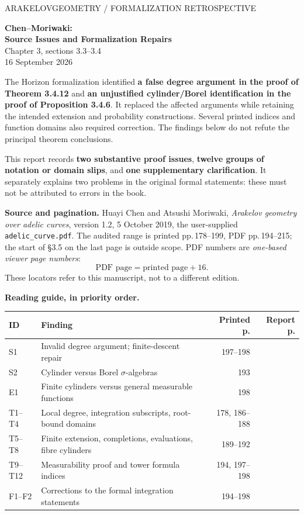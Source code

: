 \documentclass[10pt,a4paper]{article}
\newcommand{\code}[1]{{\small\nolinkurl{#1}}}
\begin{document}
\thispagestyle{plain}
{\small\sffamily\color{graytext}ARAKELOVGEOMETRY \quad / \quad FORMALIZATION RETROSPECTIVE}
\vspace{10pt}
\begin{flushleft}
{\huge\sffamily\bfseries\color{navy}Chen--Moriwaki:\\[3pt]Source Issues and Formalization Repairs}\\[10pt]
{\large Chapter 3, sections 3.3--3.4}\\[5pt]
{16 September 2026}
\end{flushleft}

The Horizon formalization identified \textbf{a false degree argument in the proof
of Theorem 3.4.12} and \textbf{an unjustified cylinder/Borel identification in the
proof of Proposition 3.4.6}. It replaced the affected arguments while retaining
the intended extension and probability constructions. Several printed indices
and function domains also required correction. The findings below do not
refute the principal theorem conclusions.

This report records \textbf{two substantive proof issues}, \textbf{twelve groups
of notation or domain slips}, and \textbf{one supplementary clarification}.
It separately explains two problems in the original formal statements:
these must not be attributed to errors in the book.

\textbf{Source and pagination.} Huayi Chen and Atsushi Moriwaki,
\emph{Arakelov geometry over adelic curves}, version 1.2, 5 October 2019,
the user-supplied \code{adelic_curve.pdf}. The audited range is printed
pp.\,178--199, PDF pp.\,194--215; the start of \S3.5 on the last page is
outside scope. PDF numbers are \emph{one-based viewer page numbers}:
\[
\boxed{\text{PDF page} = \text{printed page} + 16.}
\]
These locators refer to this manuscript, not to a different edition.

\textbf{Reading guide, in priority order.}
\begin{center}
\small
\begin{tabularx}{\linewidth}{@{}lXrr@{}}
\toprule
ID & Finding & Printed p. & Report p.\\
\midrule
S1 & Invalid degree argument; finite-descent repair & 197--198 & \pageref{s1}\\
S2 & Cylinder versus Borel $\sigma$-algebras & 193 & \pageref{s2}\\
E1 & Finite cylinders versus general measurable functions & 198 & \pageref{e1}\\
T1--T4 & Local degree, integration subscripts, root-bound domains & 178, 186--188 & \pageref{t1}\\
T5--T8 & Finite extension, completions, evaluations, fibre cylinders & 189--192 & \pageref{t5}\\
T9--T12 & Measurability proof and tower formula indices & 194, 197--198 & \pageref{t9}\\
F1--F2 & Corrections to the formal integration statements & 194--198 & \pageref{f1}\\
\bottomrule
\end{tabularx}
\end{center}
\end{document}
